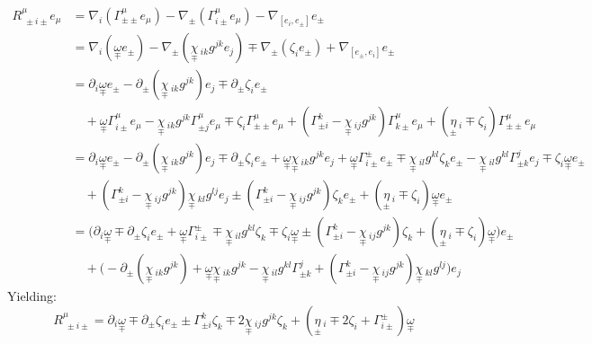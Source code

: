 \documentclass[a4paper,11pt]{article}
\numberwithin{equation}{section}
\theoremstyle{definition}
\begin{document}
\begin{align*}
    R^\mu_{\;\pm i\pm} e_\mu &= \nabla_i(\Gamma_{\pm\pm}^\mu e_\mu) - \nabla_\pm( \Gamma_{i\pm}^\mu e_\mu) - \nabla_{[e_i,e_\pm]}e_\pm\\
    &= \nabla_i(\underset{\mp}{\omega} e_\pm) - \nabla_\pm( \underset{\mp}{\chi}\,_{ik}g^{jk} e_j) \mp  \nabla_\pm( \zeta_i e_\pm) + \nabla_{[e_\pm,e_i]}e_\pm\\
    &= \partial_i\underset{\mp}{\omega} e_\pm - \partial_\pm( \underset{\mp}{\chi}\,_{ik}g^{jk}) e_j \mp  \partial_\pm \zeta_i e_\pm\\
    &\quad +\underset{\mp}{\omega}\Gamma_{i\pm}^\mu e_\mu - \underset{\mp}{\chi}\,_{ik}g^{jk}\Gamma_{\pm j}^\mu e_\mu \mp  \zeta_i \Gamma_{\pm\pm}^\mu e_\mu + (\Gamma_{\pm i}^k - \underset{\mp}{\chi}\,_{ij}g^{jk})\Gamma_{k\pm}^\mu e_\mu+(\underset{\pm}{\eta}\,_i \mp \zeta_i)\Gamma_{\pm\pm}^\mu e_\mu\\
    &= \partial_i\underset{\mp}{\omega} e_\pm - \partial_\pm( \underset{\mp}{\chi}\,_{ik}g^{jk}) e_j \mp  \partial_\pm \zeta_i e_\pm  +\underset{\mp}{\omega}\underset{\mp}{\chi}\,_{ik}g^{jk} e_j+\underset{\mp}{\omega}\Gamma_{i\pm}^\pm e_\pm \mp \underset{\mp}{\chi}\,_{il}g^{kl}\zeta_k e_\pm- \underset{\mp}{\chi}\,_{il}g^{kl}\Gamma_{\pm k}^j e_j \mp  \zeta_i \underset{\mp}{\omega} e_\pm \\
    &\quad + (\Gamma_{\pm i}^k - \underset{\mp}{\chi}\,_{ij}g^{jk})\underset{\mp}{\chi}\,_{kl}g^{lj} e_j \pm (\Gamma_{\pm i}^k - \underset{\mp}{\chi}\,_{ij}g^{jk})\zeta_k e_\pm+(\underset{\pm}{\eta}\,_i \mp \zeta_i)\underset{\mp}{\omega} e_\pm\\
    &= \Big(\partial_i\underset{\mp}{\omega} \mp  \partial_\pm \zeta_i e_\pm +\underset{\mp}{\omega}\Gamma_{i\pm}^\pm \mp \underset{\mp}{\chi}\,_{il}g^{kl}\zeta_k \mp  \zeta_i \underset{\mp}{\omega} \pm (\Gamma_{\pm i}^k - \underset{\mp}{\chi}\,_{ij}g^{jk})\zeta_k +(\underset{\pm}{\eta}\,_i \mp \zeta_i)\underset{\mp}{\omega} \Big)e_\pm\\
    &\quad +\Big(- \partial_\pm( \underset{\mp}{\chi}\,_{ik}g^{jk}) +\underset{\mp}{\omega}\underset{\mp}{\chi}\,_{ik}g^{jk}- \underset{\mp}{\chi}\,_{il}g^{kl}\Gamma_{\pm k}^j + (\Gamma_{\pm i}^k - \underset{\mp}{\chi}\,_{ij}g^{jk})\underset{\mp}{\chi}\,_{kl}g^{lj} \Big)e_j
\end{align*}
Yielding:
\begin{equation}
    \boxed{R^\mu_{\;\pm i\pm} = \partial_i\underset{\mp}{\omega} \mp  \partial_\pm \zeta_i e_\pm \pm \Gamma_{\pm i}^k\zeta_k \mp 2 \underset{\mp}{\chi}\,_{ij}g^{jk}\zeta_k +(\underset{\pm}{\eta}\,_i \mp 2\zeta_i + \Gamma_{i\pm}^\pm)\underset{\mp}{\omega}}
\end{equation}
\end{document}
